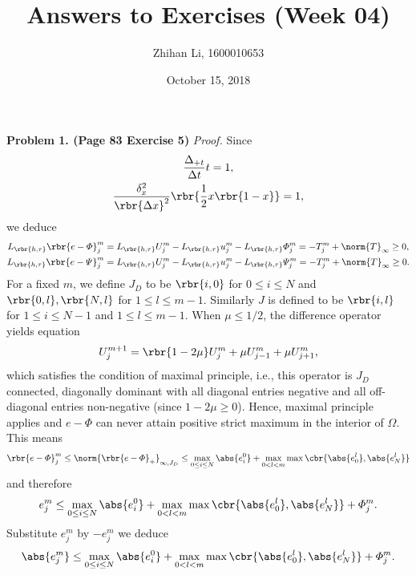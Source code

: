 \documentclass[english, nochinese]{pnote}
\title{Answers to Exercises (Week 04)}
\author{Zhihan Li, 1600010653}
\date{October 15, 2018}
\begin{document}
\maketitle

\textbf{Problem 1. (Page 83 Exercise 5)} \textit{Proof.} Since
\begin{gather}
\frac{\Delta_{ + t }}{ \Delta t } t = 1, \\
\frac{\delta_x^2}{\rbr{ \Delta x }^2} \rbr{ \frac{1}{2} x \rbr{ 1 - x } } = 1,
\end{gather}
we deduce
\begin{gather}
L_{\rbr{ h, \tau }} \rbr{ e - \varPhi }_j^m = L_{\rbr{ h, \tau }} U_j^m - L_{\rbr{ h, \tau }} u_j^m - L_{\rbr{ h, \tau }} \varPhi_j^m = - T_j^m + \norm{T}_{\infty} \ge 0, \\
L_{\rbr{ h, \tau }} \rbr{ e - \varPsi }_j^m = L_{\rbr{ h, \tau }} U_j^m - L_{\rbr{ h, \tau }} u_j^m - L_{\rbr{ h, \tau }} \varPsi_j^m = - T_j^m + \norm{T}_{\infty} \ge 0.
\end{gather}
For a fixed $m$, we define $J_D$ to be $ \rbr{ i, 0 } $ for $ 0 \le i \le N $ and $ \rbr{ 0, l }, \rbr{ N, l } $ for $ 1 \le l \le m - 1 $. Similarly $J$ is defined to be $ \rbr{ i, l } $ for $ 1 \le i \le N - 1 $ and $ 1 \le l \le m - 1 $. When $ \mu \le 1 / 2 $, the difference operator yields equation
\begin{equation}
U_j^{ m + 1 } = \rbr{ 1 - 2 \mu } U_j^m + \mu U_{ j - 1 }^m + \mu U_{ j + 1 }^m,
\end{equation}
which satisfies the condition of maximal principle, i.e., this operator is $J_D$ connected, diagonally dominant with all diagonal entries negative and all off-diagonal entries non-negative (since $ 1 - 2 \mu \ge 0 $). Hence, maximal principle applies and $ e - \varPhi $ can never attain positive strict maximum in the interior of $\Omega$. This means
\begin{equation}
\rbr{ e - \varPhi }_j^m \le \norm{\rbr{ e - \varPhi }_+}_{ \infty, J_D } \le \max_{ 0 \le i \le N } \abs{e_i^0} + \max_{ 0 < l < m } \max \cbr{ \abs{e_0^l}, \abs{e_N^l} }
\end{equation}
and therefore
\begin{equation}
e_j^m \le \max_{ 0 \le i \le N } \abs{e_i^0} + \max_{ 0 < l < m } \max \cbr{ \abs{e_0^l}, \abs{e_N^l} } + \varPhi_j^m.
\end{equation}
Substitute $e_j^m$ by $-e_j^m$ we deduce
\begin{equation}
\abs{e_j^m} \le \max_{ 0 \le i \le N } \abs{e_i^0} + \max_{ 0 < l < m } \max \cbr{ \abs{e_0^l}, \abs{e_N^l} } + \varPhi_j^m.
\end{equation}
\end{document}
